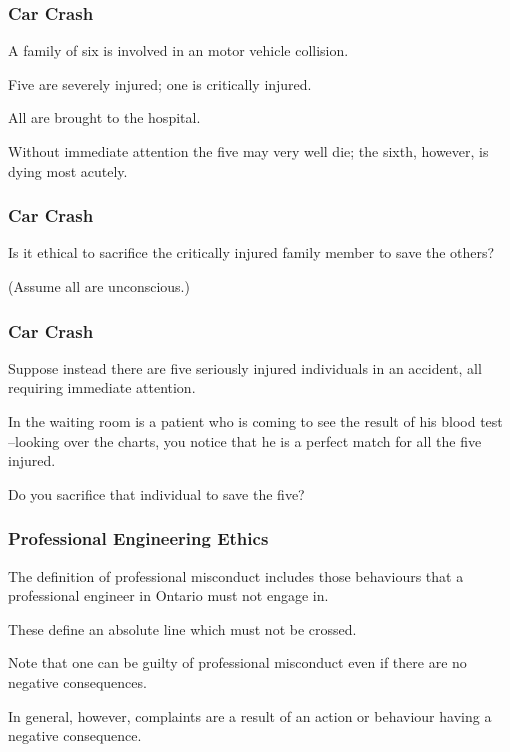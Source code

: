 \begin{frame}
\frametitle{Car Crash}

A family of six is involved in an motor vehicle collision. 

Five are severely injured; one is critically injured.

All are brought to the hospital. 

Without immediate attention the five may very well die; the sixth, however, is dying most acutely.

\end{frame}



\begin{frame}
\frametitle{Car Crash}

Is it ethical to sacrifice the critically injured family member to save the others?  

(Assume all are unconscious.)

\end{frame}

\begin{frame}
\frametitle{Car Crash}

Suppose instead there are five seriously injured individuals in an accident, all requiring immediate attention.

In the waiting room is a patient who is coming to see the result of his blood test --looking over the charts, you notice that he is a perfect match for all the five injured.

Do you sacrifice that individual to save the five?  

\end{frame}



\begin{frame}
\frametitle{Professional Engineering Ethics}

The definition of professional misconduct includes those behaviours that a professional engineer in Ontario must not engage in.

These define an absolute line which must not be crossed.

Note that one can be guilty of professional misconduct even if there are no negative consequences.

In general, however, complaints are a result of an action or behaviour having a negative consequence.


\end{frame}



